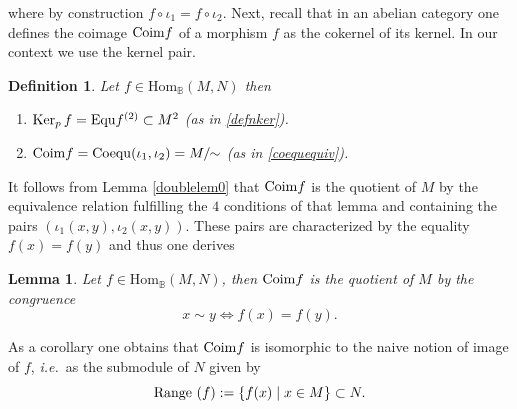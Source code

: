 \documentclass[12pt]{article}
\newtheorem{lem}[thm]{Lemma}
\newtheorem{defn}[thm]{Definition}
\def\Hom{{\rm Hom}}
\def\Kpr{{\rm Ker}_p\,}
\def\equ{{\rm Equ}}
\def\coequ{{\rm Coequ}}
\def\B{{\mathbb B}}
\newcommand{\ie}{{\it i.e.\/}\ }
\def\Hom {{\mbox{Hom}}}
\def\coim{{\rm Coim}}
\begin{document}
where by construction $f\circ \iota_1=f\circ \iota_2$. 
Next, recall that in an abelian category one defines the coimage  $\coim f$ of a morphism $f$ as the cokernel of its kernel. In our context we use the kernel pair.
\begin{defn}\label{paircomp3} Let $f\in \Hom_\B(M,N)$ then 
\begin{enumerate}
\item $\Kpr f=\equ f^{(2)}\subset M^2$  (as in \eqref{defnker}).
\item $\coim f=\coequ(\iota_1,\iota_2)=M/\!\!\sim$ (as in \eqref{coequequiv}).
\end{enumerate}	
\end{defn}
It follows from Lemma \ref{doublelem0} that $\coim f$ is the quotient of $M$ by the equivalence relation fulfilling the $4$ conditions of that lemma  and containing the pairs $(\iota_1(x,y),\iota_2(x,y))$. These pairs are characterized by the equality $f(x)=f(y)$ and thus one derives
\begin{lem} \label{coimlem} 
Let $f\in \Hom_\B(M,N)$, then $\coim f$ is the quotient of $M$ by the congruence 
\[
x\sim y\iff f(x)=f(y).
\]
\end{lem}

As a corollary one obtains that $\coim f$ is isomorphic to the naive notion of image of $f$, \ie as the submodule of $N$ given by 
\begin{equation}\label{naiveim}
	{\rm Range}\ (f):=\{f(x)\mid x\in M\}\subset N.
	\end{equation}
	
\end{document}

